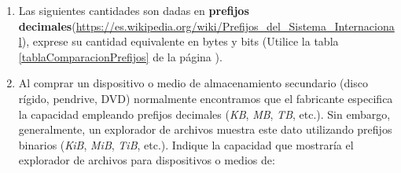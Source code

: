 \documentclass[12pt]{article}
\begin{document}
\begin{enumerate}

    \item Las siguientes cantidades son dadas en \textbf{prefijos
        decimales}(\url{https://es.wikipedia.org/wiki/Prefijos_del_Sistema_Internacional}),
        exprese su cantidad equivalente en bytes y bits  (Utilice la tabla
        \ref{tablaComparacionPrefijos} de la página
        \pageref{tablaComparacionPrefijos}).


        \item Al comprar un dispositivo o medio de almacenamiento secundario
            (disco rígido, pendrive, DVD) normalmente encontramos que el
            fabricante especifica la capacidad empleando prefijos decimales
            (\emph{KB}, \emph{MB}, \emph{TB}, etc.). Sin embargo,
            generalmente, un explorador de archivos muestra este dato
            utilizando prefijos binarios (\emph{KiB}, \emph{MiB}, \emph{TiB},
            etc.). Indique la capacidad que mostraría el explorador de
            archivos para dispositivos o medios de:

\end{enumerate}
\end{document}
